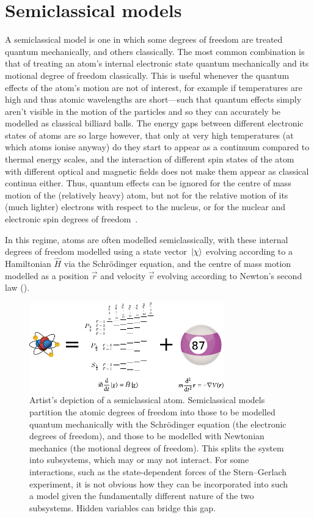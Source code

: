 \section{Semiclassical models}\label{sec:semiclassical_methods}

A semiclassical model is one in which some degrees of freedom are treated quantum mechanically, and others classically. The most common combination is that of treating an atom's internal electronic state quantum mechanically and its motional degree of freedom classically. This is useful whenever the quantum effects of the atom's motion are not of interest, for example if temperatures are high and thus atomic wavelengths are short---such that quantum effects simply aren't visible in the motion of the particles and so they can accurately be modelled as classical billiard balls. The energy gaps between different electronic states of atoms are so large however, that only at very high temperatures (at which atoms ionise anyway) do they start to appear as a continuum compared to thermal energy scales, and the interaction of different spin states of the atom with different optical and magnetic fields does not make them appear as classical continua either. Thus, quantum effects can be ignored for the centre of mass motion of the (relatively heavy) atom, but not for the relative motion of its (much lighter) electrons with respect to the nucleus, or for the nuclear and electronic spin degrees of freedom~\cite{doi:10.1063/1.459170}.

In this regime, atoms are often modelled semiclassically, with these internal degrees of freedom modelled using a state vector $\ket\chi$ evolving according to a Hamiltonian $\hat H$ via the Schr\"odinger equation, and the centre of mass motion modelled as a position $\vec r$ and velocity $\vec v$ evolving according to Newton's second law ().

\begin{figure}[t]
    \centerfloat
    \includegraphics[width=0.75\textwidth]{figures/hidden_variables/semiclassical.pdf}
    \caption{Artist's depiction of a semiclassical atom. Semiclassical models partition the atomic degrees of freedom into those to be modelled quantum mechanically with the Schr\"odinger equation (the electronic degrees of freedom), and those to be modelled with Newtonian mechanics (the motional degrees of freedom). This splits the system into subsystems, which may or may not interact. For some interactions, such as the state-dependent forces of the Stern--Gerlach experiment, it is not obvious how they can be incorporated into such a model given the fundamentally different nature of the two subsystems. Hidden variables can bridge this gap.}
    \label{fig:semiclassical}
\end{figure}

